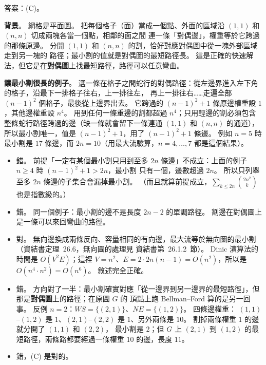 \begin{pastsoln}
答案：(C)。

\textbf{背景}。 網格是平面圖。 把每個格子（面）當成一個點、外面的區域沿 $(1,1)$ 和 $(n,n)$ 切成兩塊各當一個點，相鄰的面之間
連一條「對偶邊」，權重等於它跨過的那條原邊。 分開 $(1,1)$ 和 $(n,n)$ 的割，恰好對應對偶圖中從一塊外部區域走到另一塊的
路徑；最小割的值就是對偶圖的最短路徑長。 這是正確的快速解法，但它是在\textbf{對偶圖}上找最短路徑，路徑可以任意彎曲。

\textbf{讓最小割很長的例子}。 選一條在格子之間蛇行的對偶路徑：從左邊界進入左下角的格子，沿最下一排格子往右，上一排往左，
再上一排往右……走遍全部 $(n-1)^2$ 個格子，最後從上邊界出去。 它跨過的 $(n-1)^2 + 1$ 條原邊權重設 $1$，其他邊權重設
$n^4$。 用到任何一條重邊的割都超過 $n^4$；只用輕邊的割必須包含整條蛇行路徑跨過的邊（缺一條就會留下一條連通
$(1,1)$ 和 $(n,n)$ 的通道），所以最小割唯一，值是 $(n-1)^2 + 1$，用了 $(n-1)^2 + 1$ 條邊。 例如 $n = 5$ 時最小割是
$17$ 條邊，而 $2n = 10$（用最大流驗算，$n = 4, \ldots, 7$ 都是這個結果）。

\begin{itemize}
\item[(A)] 錯。 前提「一定有某個最小割只用到至多 $2n$ 條邊」不成立：上面的例子 $n \ge 4$ 時 $(n-1)^2 + 1 > 2n$，最小割
只有一個，邊數超過 $2n$。 所以只列舉至多 $2n$ 條邊的子集合會漏掉最小割。 （而且就算前提成立，$\sum_{k \le 2n}
\binom{2n^2}{k}$ 也是指數級的。）
\item[(B)] 錯。 同一個例子：最小割的邊不是長度 $2n - 2$ 的單調路徑。 割邊在對偶圖上是一條可以來回彎曲的路徑。
\item[(C)] 對。 無向邊換成兩條反向、容量相同的有向邊，最大流等於無向圖的最小割（資結書定理~26.6，無向圖的處理見
資結書第~26.1.2~節）。 Dinic 演算法的時間是 $O(V^2 E)$；這裡 $V = n^2$、$E = 2 \cdot 2n(n-1) = O(n^2)$，所以是
$O(n^4 \cdot n^2) = O(n^6)$。 敘述完全正確。
\item[(D)] 錯。 方向對了一半：最小割確實對應「從一邊界到另一邊界的最短路徑」，但那是\textbf{對偶圖}上的路徑；在原圖 $G$ 的
頂點上跑 Bellman--Ford 算的是另一回事。 反例 $n = 2$：$WS = \{(2,1)\}$、$NE = \{(1,2)\}$。 四條邊權重：
$(1,1)$--$(1,2)$ 是 $1$、$(2,1)$--$(2,2)$ 是 $1$、另外兩條是 $10$。 割掉兩條權重 $1$ 的邊就分開了 $(1,1)$ 和 $(2,2)$，
最小割是 $2$；但 $G$ 上 $(2,1)$ 到 $(1,2)$ 的最短路徑，兩條路都要經過一條權重 $10$ 的邊，長度 $11$。
\item[(E)] 錯，(C) 是對的。
\end{itemize}
\end{pastsoln}
